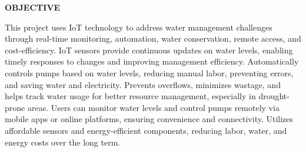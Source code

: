 \vspace*{0.6cm}
\begin{center}
    \fontsize{16}{19}\selectfont
    \textbf{OBJECTIVE}\\[0.5cm]
\end{center}

\vspace{1cm}
{
\fontsize{12}{14}\selectfont
\noindent
This project uses IoT technology to address water management challenges through real-time monitoring, automation, water conservation, remote access, and cost-efficiency. IoT sensors provide continuous updates on water levels, enabling timely responses to changes and improving management efficiency. Automatically controls pumps based on water levels, reducing manual labor, preventing errors, and saving water and electricity. Prevents overflows, minimizes wastage, and helps track water usage for better resource management, especially in drought-prone areas. Users can monitor water levels and control pumps remotely via mobile apps or online platforms, ensuring convenience and connectivity. Utilizes affordable sensors and energy-efficient components, reducing labor, water, and energy costs over the long term.
} 